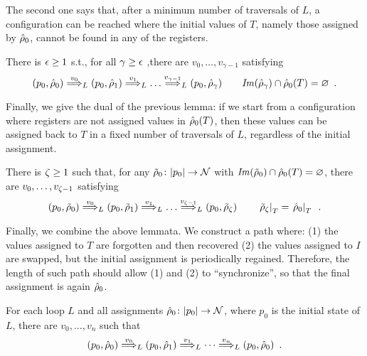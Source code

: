 %
The second one says that, after a minimum number of traversals of $L$, a configuration can be reached where the initial values of $T$, namely those assigned by $\hat{\rho}_0$, cannot be found in any of the registers.
%
\begin{lemma}
There is $\epsilon \geq 1$ s.t., for all $\gamma \geq \epsilon$ ,there are $v_0,\dots,v_{\gamma-1}$ satisfying
\[
	(p_0,\hat{\rho}_0) \overset{v_0}{\Longrightarrow}_{L} (p_0,\hat{\rho}_1) \overset{v_1}{\Longrightarrow}_{L} \dots \overset{v_{\gamma-1}}{\Longrightarrow}_{L} (p_0,\hat{\rho}_\gamma)
	\qquad 
	\mathit{Im}(\hat{\rho}_\gamma) \cap \hat{\rho}_0(T) = \varnothing \enspace .
\]
\label{lem:forgetT}
\end{lemma}
%
\vspace{-5ex}
%
Finally, we give the dual of the previous lemma: if we start from a configuration where registers are not assigned values in $\hat{\rho}_0(T)$, then these values can be assigned back to $T$ in a fixed number of traversals of $L$, regardless of the initial assignment.

\begin{lemma}
There is $\zeta \geq 1$ such that,
for any $\tilde{\rho}_0 \colon |p_0| \to \mathcal{N}$ with $\mathit{Im}(\tilde{\rho}_0) \cap \hat{\rho}_0(T) = \varnothing$, there are $v_0,\dots,v_{\zeta-1}$ satisfying
\[
	(p_0,\tilde{\rho}_0) \overset{v_0}{\Longrightarrow}_{L} (p_0,\tilde{\rho}_1) \overset{v_1}{\Longrightarrow}_{L} \dots \overset{v_{\zeta-1}}{\Longrightarrow}_{L} (p_0,\tilde{\rho}_\zeta)	
	\qquad
	\left.\tilde{\rho}_\zeta\right|_{T} = \left.\hat{\rho}_0\right|_{T} \enspace .
\]
\label{lem:initT}
\end{lemma}
%
\vspace{-4ex}
%
Finally, we combine the above lemmata. We construct a path where: (1) the values assigned to $T$ are forgotten and then recovered (2) the values assigned to $I$ are swapped, but the initial assignment is periodically regained. Therefore, the length of such path should allow (1) and (2) to ``synchronize'', so that the final assignment is again $\hat{\rho}_0$.

\begin{theorem}
\label{thm:loop}
%
%
For each loop $L$ and all assignments $\hat{\rho}_0 \colon |p_0| \to \mathcal{N}$, where $p_0$ is the initial state of $L$, there are $v_0,\dots,v_n$ such that
\[
	(p_0, \hat{\rho}_0) \overset{v_0}{\Longrightarrow}_{L} (p_0, \hat{\rho}_1) \overset{v_1}{\Longrightarrow}_{L} \cdots \overset{v_n}{\Longrightarrow}_{L} (p_0,\hat{\rho}_0) \enspace .
\]
\end{theorem}

